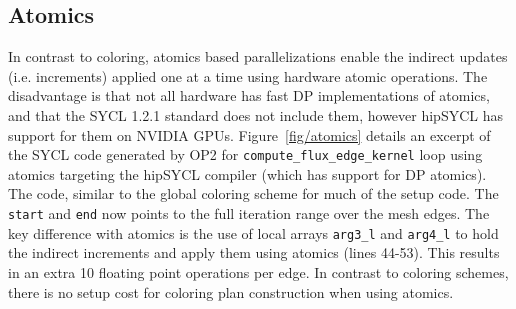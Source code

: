 \documentclass[runningheads]{llncs}
\begin{document}
\vspace{-10pt}
\subsection{Atomics}\label{subsec/atomics}
\vspace{-5pt}
\noindent In contrast to coloring, atomics based parallelizations enable the 
indirect updates (i.e. increments) applied one at a time using hardware atomic 
operations. The disadvantage is that not all hardware has fast DP 
implementations of atomics, and that the SYCL 1.2.1 standard does not include 
them, however hipSYCL has support for them on NVIDIA GPUs. 
Figure~\ref{fig/atomics} details an excerpt of the SYCL code generated by OP2 
for \texttt{compute\_flux\_edge\_kernel} loop using atomics targeting the 
hipSYCL compiler (which has support for DP atomics). The code, similar to the 
global coloring scheme for much of the setup code. The \texttt{start} and 
\texttt{end} now points to the full iteration range over the mesh edges. The key 
difference with atomics is the use of local arrays \texttt{arg3\_l} and 
\texttt{arg4\_l} to hold the indirect increments and apply them using atomics 
(lines 44-53). This results in an extra 10 floating point operations per edge. 
In contrast to coloring schemes, there is no setup cost for coloring plan 
construction when using atomics.  








\vspace{-10pt}
\end{document}

